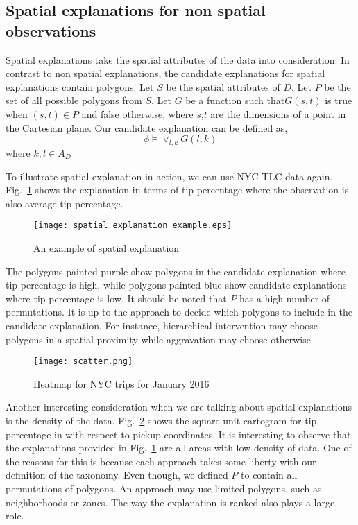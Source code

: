 \subsection{Spatial explanations for non spatial observations}
\label{sec:spatial_nonspatial}

Spatial explanations take the spatial attributes of the data into consideration. In contrast to non spatial explanations, the candidate explanations for spatial explanations contain polygons. Let $S$ be the spatial attributes of $D$. Let $P$ be the set of all possible polygons from $S$. Let $G$ be a function such that$G(s,t)$ is true when $(s,t) \in P$ and false otherwise, where $s$,$t$ are the dimensions of a point in the Cartesian plane. Our candidate explanation can be defined as,
$$\phi  \models \vee_{l,k} G(l,k)$$
where $k,l \in A_D$

To illustrate spatial explanation in action, we can use NYC TLC data again. Fig.~\ref{fig:spatial_explanation_example} shows the explanation in terms of tip percentage where the observation is also average tip percentage.

\begin{figure}[ht]
\texttt{[image: spatial\_explanation\_example.eps]}
\caption{An example of spatial explanation}
\label{fig:spatial_explanation_example}
\end{figure}

The polygons painted purple show polygons in the candidate explanation where tip percentage is high, while polygons painted blue show candidate explanations where tip percentage is low. It should be noted that $P$ has a high number of permutations. It is up to the approach to decide which polygons to include in the candidate explanation. For instance, hierarchical intervention may choose polygons in a spatial proximity while aggravation may choose otherwise.
\begin{figure}[ht]
\texttt{[image: scatter.png]}
\caption{Heatmap for NYC trips for January 2016}
\label{fig:square_unit_grid}
\end{figure}

Another interesting consideration when we are talking about spatial explanations is the density of the data. Fig.~\ref{fig:square_unit_grid} shows the square unit cartogram for tip percentage in with respect to pickup coordinates. It is interesting to observe that the explanations provided in Fig.~\ref{fig:spatial_explanation_example} are all areas with low density of data. One of the reasons for this is because each approach takes some liberty with our definition of the taxonomy. Even though, we defined $P$ to contain all permutations of polygons. An approach may use limited polygons, such as neighborhoods or zones. The way the explanation is ranked also plays a large role.

